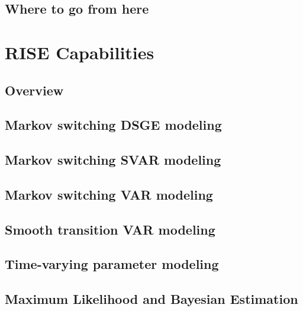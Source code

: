 \documentclass[letterpaper,10pt,english]{sphinxmanual}
\begin{document}
\section{Where to go from here}
\label{getting_started_folder/where_to_go_now::doc}\label{getting_started_folder/where_to_go_now:where-to-go-from-here}

\chapter{RISE Capabilities}
\label{capabilities:rise-capabilities}\label{capabilities::doc}

\section{Overview}
\label{capabilities:overview}

\section{Markov switching DSGE modeling}
\label{capabilities:markov-switching-dsge-modeling}

\section{Markov switching SVAR modeling}
\label{capabilities:markov-switching-svar-modeling}

\section{Markov switching VAR modeling}
\label{capabilities:markov-switching-var-modeling}

\section{Smooth transition VAR modeling}
\label{capabilities:smooth-transition-var-modeling}

\section{Time-varying parameter modeling}
\label{capabilities:time-varying-parameter-modeling}

\section{Maximum Likelihood and Bayesian Estimation}
\label{capabilities:maximum-likelihood-and-bayesian-estimation}
\end{document}
